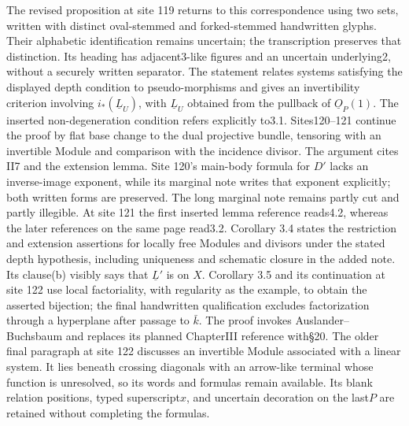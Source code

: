 \documentclass[10pt,a4paper]{article}
\begin{document}
The revised proposition at site 119 returns to this correspondence using two sets, written with distinct oval-stemmed and forked-stemmed handwritten glyphs. Their alphabetic identification remains uncertain; the transcription preserves that distinction. Its heading has adjacent3-like figures and an uncertain underlying2, without a securely written separator. The statement relates systems satisfying the displayed depth condition to pseudo-morphisms and gives an invertibility criterion involving $i_*(\underline L_U)$, with $\underline L_U$ obtained from the pullback of $\underline O_P(1)$. The inserted non-degeneration condition refers explicitly to3.1. Sites120--121 continue the proof by flat base change to the dual projective bundle, tensoring with an invertible Module and comparison with the incidence divisor. The argument cites II7 and the extension lemma. Site 120's main-body formula for $D'$ lacks an inverse-image exponent, while its marginal note writes that exponent explicitly; both written forms are preserved. The long marginal note remains partly cut and partly illegible. At site 121 the first inserted lemma reference reads4.2, whereas the later references on the same page read3.2. Corollary 3.4 states the restriction and extension assertions for locally free Modules and divisors under the stated depth hypothesis, including uniqueness and schematic closure in the added note. Its clause(b) visibly says that $\underline L'$ is on $X$. Corollary 3.5 and its continuation at site 122 use local factoriality, with regularity as the example, to obtain the asserted bijection; the final handwritten qualification excludes factorization through a hyperplane after passage to $\bar k$. The proof invokes Auslander--Buchsbaum and replaces its planned ChapterIII reference with\S20. The older final paragraph at site 122 discusses an invertible Module associated with a linear system. It lies beneath crossing diagonals with an arrow-like terminal whose function is unresolved, so its words and formulas remain available. Its blank relation positions, typed superscript$x$, and uncertain decoration on the last$P$ are retained without completing the formulas.
\par{}

\par{}
\end{document}
